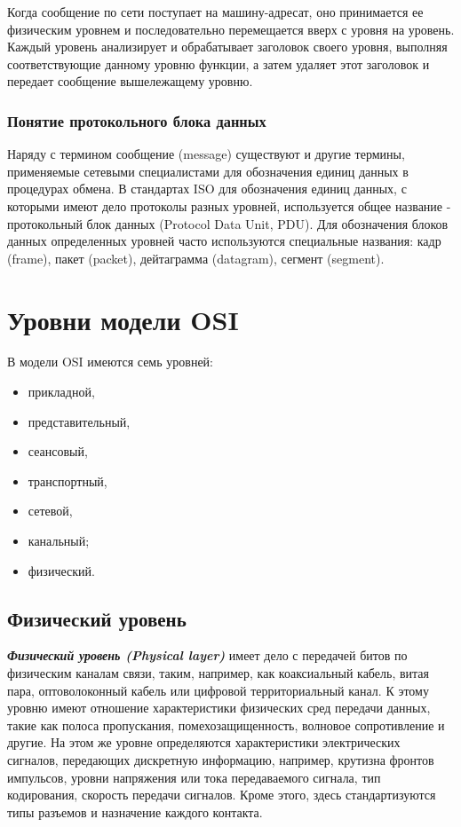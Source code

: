 Когда сообщение по сети поступает на машину-адресат, оно принимается ее физическим уровнем и последовательно перемещается вверх с уровня на уровень.
Каждый уровень анализирует и обрабатывает заголовок своего уровня, выполняя соответствующие данному уровню функции, а затем удаляет этот заголовок и передает сообщение вышележащему уровню.

\subsubsection{Понятие протокольного блока данных}

Наряду с термином сообщение (message) существуют и другие термины, применяемые сетевыми специалистами для обозначения единиц данных в процедурах обмена.
В стандартах ISO для обозначения единиц данных, с которыми имеют дело протоколы разных уровней, используется общее название - протокольный блок данных (Protocol Data Unit, PDU).
Для обозначения блоков данных определенных уровней часто используются специальные названия: кадр (frame), пакет (packet), дейтаграмма (datagram), сегмент (segment).

\section{Уровни модели OSI}

В модели OSI имеются семь уровней:
\begin{itemize}
    \item прикладной,
    \item представительный,
    \item сеансовый,
    \item транспортный,
    \item сетевой,
    \item канальный;
    \item физический.
\end{itemize}

\subsection{Физический уровень}

\textbf{\textit{Физический уровень (Physical layer)}} имеет дело с передачей битов по физическим каналам связи, таким, например, как коаксиальный кабель, витая пара, оптоволоконный кабель или цифровой территориальный канал.
К этому уровню имеют отношение характеристики физических сред передачи данных, такие как полоса пропускания, помехозащищенность, волновое сопротивление и другие.
На этом же уровне определяются характеристики электрических сигналов, передающих дискретную информацию, например, крутизна фронтов импульсов, уровни напряжения или тока передаваемого сигнала, тип кодирования, скорость передачи сигналов.
Кроме этого, здесь стандартизуются типы разъемов и назначение каждого контакта.

